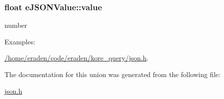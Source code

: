 \subsubsection[{\texorpdfstring{value}{value}}]{\setlength{\rightskip}{0pt plus 5cm}float e\+J\+S\+O\+N\+Value\+::value}\hypertarget{unioneJSONValue_ab11e9f87db2db5f129e49acefe49072c}{}\label{unioneJSONValue_ab11e9f87db2db5f129e49acefe49072c}
number \begin{Desc}
\item[Examples\+: ]\par
\hyperlink{_2home_2eraden_2code_2eraden_2kore_query_2json_8h-example}{/home/eraden/code/eraden/kore\+\_\+query/json.\+h}.\end{Desc}


The documentation for this union was generated from the following file\+:\begin{DoxyCompactItemize}
\item 
\hyperlink{json_8h}{json.\+h}\end{DoxyCompactItemize}
